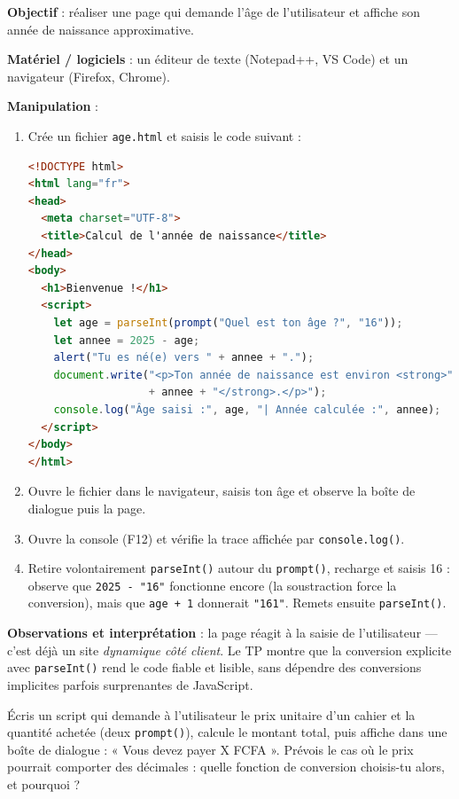 \documentclass[11pt]{article}
\begin{document}
\begin{experience}
\textbf{Objectif} : réaliser une page qui demande l'âge de l'utilisateur et affiche son année de naissance approximative.

\textbf{Matériel / logiciels} : un éditeur de texte (Notepad++, VS Code) et un navigateur (Firefox, Chrome).

\textbf{Manipulation} :
\begin{enumerate}
\item Crée un fichier \texttt{age.html} et saisis le code suivant :
\begin{lstlisting}[language=HTML]
<!DOCTYPE html>
<html lang="fr">
<head>
  <meta charset="UTF-8">
  <title>Calcul de l'année de naissance</title>
</head>
<body>
  <h1>Bienvenue !</h1>
  <script>
    let age = parseInt(prompt("Quel est ton âge ?", "16"));
    let annee = 2025 - age;
    alert("Tu es né(e) vers " + annee + ".");
    document.write("<p>Ton année de naissance est environ <strong>"
                   + annee + "</strong>.</p>");
    console.log("Âge saisi :", age, "| Année calculée :", annee);
  </script>
</body>
</html>
\end{lstlisting}
\item Ouvre le fichier dans le navigateur, saisis ton âge et observe la boîte de dialogue puis la page.
\item Ouvre la console (F12) et vérifie la trace affichée par \texttt{console.log()}.
\item Retire volontairement \texttt{parseInt()} autour du \texttt{prompt()}, recharge et saisis 16 : observe que \texttt{2025 - "16"} fonctionne encore (la soustraction force la conversion), mais que \texttt{age + 1} donnerait \texttt{"161"}. Remets ensuite \texttt{parseInt()}.
\end{enumerate}
\textbf{Observations et interprétation} : la page réagit à la saisie de l'utilisateur — c'est déjà un site \emph{dynamique côté client}. Le TP montre que la conversion explicite avec \texttt{parseInt()} rend le code fiable et lisible, sans dépendre des conversions implicites parfois surprenantes de JavaScript.
\end{experience}

\begin{exercice}
Écris un script qui demande à l'utilisateur le prix unitaire d'un cahier et la quantité achetée (deux \texttt{prompt()}), calcule le montant total, puis affiche dans une boîte de dialogue : « Vous devez payer X FCFA ». Prévois le cas où le prix pourrait comporter des décimales : quelle fonction de conversion choisis-tu alors, et pourquoi ?
\end{exercice}
\end{document}
